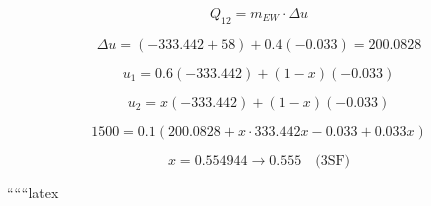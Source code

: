 \[
Q_{12} = m_{EW} \cdot \Delta u
\]

\[
\Delta u = \left( -333.442 + 58 \right) + 0.4 \left( -0.033 \right) = 200.0828
\]

\[
u_1 = 0.6 \left( -333.442 \right) + (1 - x) \left( -0.033 \right)
\]

\[
u_2 = x \left( -333.442 \right) + (1 - x) \left( -0.033 \right)
\]

\[
1500 = 0.1 \left( 200.0828 + x \cdot 333.442 x - 0.033 + 0.033 x \right)
\]

\[
x = 0.554944 \rightarrow 0.555 \quad \text{(3SF)}
\]

``````latex



